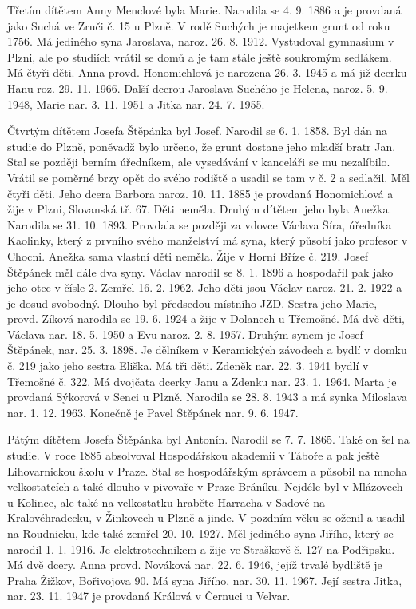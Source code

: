 \documentclass[../dejiny-rodu-prusiku.tex]{subfiles}
\begin{document}
Třetím dítětem Anny Menclové byla Marie. Narodila se 4. 9. 1886 a je provdaná jako Suchá ve Zruči č. 15  u Plzně. V rodě Suchých je majetkem grunt od roku 1756. Má jediného syna Jaroslava, naroz. 26. 8. 1912. Vystudoval gymnasium v Plzni, ale po studiích vrátil se domů a je tam stále ještě soukromým sedlákem. Má čtyři děti. Anna provd. Honomichlová je narozena 26. 3. 1945 a má již dcerku Hanu roz. 29. 11. 1966. Další dcerou Jaroslava Suchého je Helena, naroz. 5. 9. 1948, Marie nar. 3. 11. 1951 a Jitka nar. 24. 7. 1955.

Čtvrtým dítětem Josefa Štěpánka byl Josef. Narodil se 6. 1. 1858. Byl dán na studie do Plzně, poněvadž bylo určeno, že grunt dostane jeho mladší bratr Jan. Stal se později berním úředníkem, ale vysedávání v kanceláři se mu nezalíbilo. Vrátil se poměrné brzy opět do svého rodiště a usadil se tam v č. 2 a sedlačil. Měl čtyři dě­ti. Jeho dcera Barbora naroz. 10. 11. 1885 je provdaná Honomichlová a žije v Plzni, Slovanská tř. 67. Děti neměla. Druhým dítětem jeho byla Anežka. Narodila se 31. 10. 1893. Provdala se později za vdovce Václava Šíra, úřed­níka Kaolinky, který z prvního svého manželství má syna, který působí jako profesor v Chocni. Anežka sama vlastní děti neměla. Žije v Horní Bříze č. 219. Josef Štěpánek měl dále dva syny. Václav narodil se 8. 1. 1896 a hospodařil pak jako jeho otec v čísle 2. Zemřel 16. 2. 1962. Jeho děti jsou Václav naroz. 21. 2. 1922 a je dosud svobodný. Dlouho byl předsedou místního JZD. Sestra jeho Marie, provd. Zíková narodila se 19. 6. 1924 a žije v Dolanech u Třemošné. Má dvě děti, Václava nar. 18. 5. 1950 a Evu naroz. 2. 8. 1957. Druhým synem je Josef Štěpánek, nar. 25. 3. 1898. Je dělníkem v Keramických závodech a bydlí v domku č. 219 jako jeho sestra Eliška. Má tři děti. Zdeněk nar. 22. 3. 1941 bydlí v Třemošné č. 322. Má dvoj­čata dcerky Janu a Zdenku nar. 23. 1. 1964. Marta je provdaná Sýkorová v Senci u Plzně. Narodila se 28. 8. 1943 a má synka Miloslava nar. 1. 12. 1963. Konečně je Pavel Ště­pánek nar. 9. 6. 1947.

Pátým dítětem Josefa Štěpánka byl Antonín. Narodil se 7. 7. 1865. Také on šel na studie. V roce 1885 absolvoval Hospodářskou akademii v Táboře a pak ještě Lihovarnickou školu v Praze. Stal se hospodářským správcem a působil na mnoha velkostatcích a také dlouho v pivovaře v Praze-Bráníku. Nejdéle byl v Mlázovech u Kolince, ale také na velkostatku hraběte Harracha v Sadové na Kralovéhradecku, v Žinkovech u Plzně a jinde. V pozdním věku se oženil a usadil na Roudnicku, kde také zemřel 20. 10. 1927. Měl jediného syna Jiřího, který se narodil 1. 1. 1916. Je elektrotechnikem a žije ve Straškově č. 127 na Podřipsku. Má dvě dcery. Anna provd. Nováková nar. 22. 6. 1946, jejíž trvalé bydliště je Praha Žižkov, Bořivojova 90. Má syna Jiřího, nar. 30. 11. 1967. Její sestra Jitka, nar. 23. 11. 1947 je provdaná Králová v Černuci u Velvar.
\end{document}
